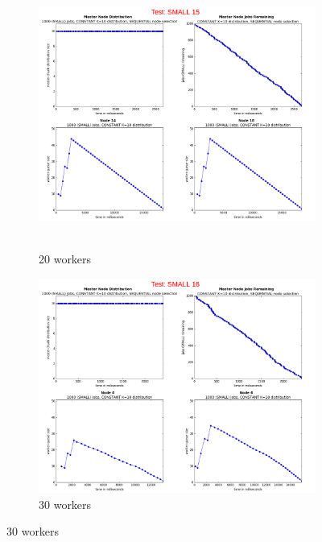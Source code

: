 \documentclass{article}
\begin{document}
\begin{figure}[p]
  
  \begin{subfigure}[b]{0.5\linewidth}
    \centering
    \hbox{\hspace{-5.0em} \includegraphics[width=1.2\linewidth]{combined_small_growing_workers_constant/case_small_15} }
    \caption{20 workers} 
    \label{testConstantSmall20} 
    \vspace{4ex}
  \end{subfigure}%
  \begin{subfigure}[b]{0.5\linewidth}
    \centering
    \includegraphics[width=1.2\linewidth]{combined_small_growing_workers_constant/case_small_16} 
    \caption{30 workers} 
    \label{testConstantSmall30} 
    \vspace{4ex}
  \end{subfigure} 
  

\end{figure}
\end{document}
